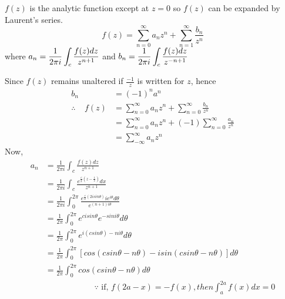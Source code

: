 \begin{solution}
$f(z)$ is the analytic function except at $z=0$ so $f(z)$ can be expanded by Laurent's series.
\[f(z)=\sum_{n=0}^{\infty}a_{n}z^{n} + \sum_{n=1}^{\infty}\frac{b_{n}}{z^{n}}\]
where $\displaystyle a_{n}=\frac{1}{2\pi i}\int_{c}\frac{f(z)dz}{z^{n+1}}$ 
and $\displaystyle b_{n}=\frac{1}{2\pi i}\int_{c}\frac{f(z)dz}{z^{-n+1}}$

Since $f(z)$ remains unaltered if $\frac{-1}{z}$ is
written for $z$, hence
\begin{align*}
b_{n} &=(-1)^{n}a^{n} \\
\therefore ~~~~~ f(z) &= \sum_{n=0}^{\infty} a_{n}z^{n}+ \sum_{n=0}^{\infty} \frac{b_{n}}{z^{n}} \\
&= \sum_{n=0}^{\infty} a_n z^n + (-1)\sum_{n=0}^{\infty} \frac{a_n}{z^n} \\
&= \sum_{- \infty}^{\infty} a_n z^n
\end{align*} 
Now,
\begin{align*}
 a_{n} &=\frac{1}{2\pi i}\int_{c}\frac{f(z)dz}{z^{n+1}} \\
&=\frac{1}{2\pi i}\int_{c}\frac{e^{\frac{c}{2}(z-\frac{1}{z})}dx}{z^{n+1}} \\
&=\frac{1}{2\pi i}\int_{0}^{2\pi}\frac{e^{\frac{c}{2}(2isin\theta)}ie^{i\theta}d\theta}{e^{(n+1)i\theta}} \\
&=\frac{1}{2\pi}\int_{0}^{2\pi}e^{cisin\theta}e^{-sini\theta}d\theta \\
&=\frac{1}{2\pi}\int_{0}^{2\pi}e^{i(csin\theta)-ni\theta}d\theta \\
&=\frac{1}{2\pi}\int_{0}^{2\pi}[cos(csin\theta-n\theta)-isin(csin\theta-n\theta)]d\theta \\
&=\frac{1}{2\pi}\int_{0}^{2\pi}cos(csin\theta-n\theta)d\theta \\
&~~~~~~~~~~~~~~~~~~~~~~~~~~~\because \text{ if, } f(2a-x)=-f(x), then \int_{a}^{2a} f(x)dx=0 
\end{align*}
\end{solution}
